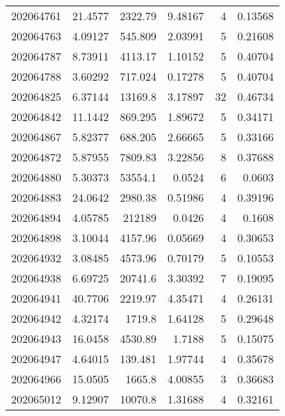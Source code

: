 \begin{tabular}{rrrrrr}
 202064761 &         21.4577  &     2322.79   &            9.48167 &           4 & 0.13568 \\
 202064763 &          4.09127 &      545.809  &            2.03991 &           5 & 0.21608 \\
 202064787 &          8.73911 &     4113.17   &            1.10152 &           5 & 0.40704 \\
 202064788 &          3.60292 &      717.024  &            0.17278 &           5 & 0.40704 \\
 202064825 &          6.37144 &    13169.8    &            3.17897 &          32 & 0.46734 \\
 202064842 &         11.1442  &      869.295  &            1.89672 &           5 & 0.34171 \\
 202064867 &          5.82377 &      688.205  &            2.66665 &           5 & 0.33166 \\
 202064872 &          5.87955 &     7809.83   &            3.22856 &           8 & 0.37688 \\
 202064880 &          5.30373 &    53554.1    &            0.0524  &           6 & 0.0603  \\
 202064883 &         24.0642  &     2980.38   &            0.51986 &           4 & 0.39196 \\
 202064894 &          4.05785 &   212189      &            0.0426  &           4 & 0.1608  \\
 202064898 &          3.10044 &     4157.96   &            0.05669 &           4 & 0.30653 \\
 202064932 &          3.08485 &     4573.96   &            0.70179 &           5 & 0.10553 \\
 202064938 &          6.69725 &    20741.6    &            3.30392 &           7 & 0.19095 \\
 202064941 &         40.7706  &     2219.97   &            4.35471 &           4 & 0.26131 \\
 202064942 &          4.32174 &     1719.8    &            1.64128 &           5 & 0.29648 \\
 202064943 &         16.0458  &     4530.89   &            1.7188  &           5 & 0.15075 \\
 202064947 &          4.64015 &      139.481  &            1.97744 &           4 & 0.35678 \\
 202064966 &         15.0505  &     1665.8    &            4.00855 &           3 & 0.36683 \\
 202065012 &          9.12907 &    10070.8    &            1.31688 &           4 & 0.32161 \\

\end{tabular}
